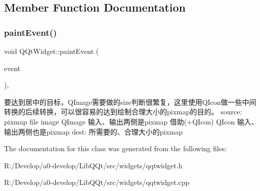 \subsection{Member Function Documentation}
\mbox{\label{class_q_qt_widget_a6ba32570495e7f880be841557cfea6ea}} 
\subsubsection{\texorpdfstring{paint\+Event()}{paintEvent()}}
{\footnotesize\ttfamily void Q\+Qt\+Widget\+::paint\+Event (\begin{DoxyParamCaption}\item[{Q\+Paint\+Event $\ast$}]{event }\end{DoxyParamCaption})\hspace{0.3cm}{\ttfamily [override]}, {\ttfamily [protected]}}

要达到居中的目标，\+Q\+Image需要做的size判断很繁复，这里使用\+Q\+Icon做一些中间转换的后续转换，可以很容易的达到绘制合理大小的pixmap的目的。 source\+: pixmap file image Q\+Image 输入、输出两侧是pixmap 借助(+\+Q\+Icon) Q\+Icon 输入、输出两侧也是pixmap dest\+: 所需要的、合理大小的pixmap

The documentation for this class was generated from the following files\+:\begin{DoxyCompactItemize}
\item 
R\+:/\+Develop/a0-\/develop/\+Lib\+Q\+Qt/src/widgets/qqtwidget.\+h\item 
R\+:/\+Develop/a0-\/develop/\+Lib\+Q\+Qt/src/widgets/qqtwidget.\+cpp\end{DoxyCompactItemize}
